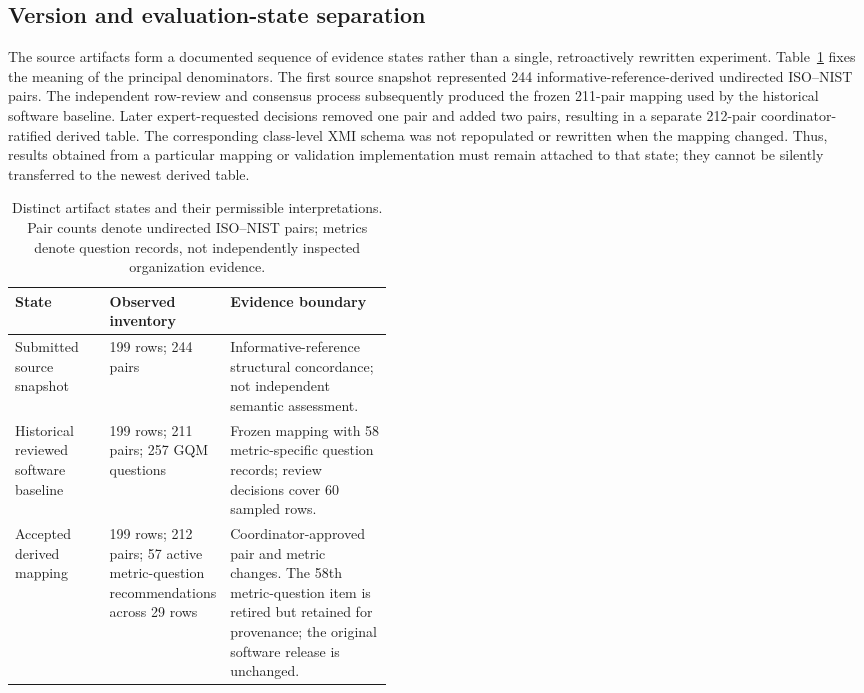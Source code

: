 \documentclass[12pt,a4paper]{article}
\begin{document}
\subsection{Version and evaluation-state separation}
\label{sec:version-states}
The source artifacts form a documented sequence of evidence states rather than a single, retroactively rewritten experiment. Table~\ref{tab:version-states} fixes the meaning of the principal denominators. The first source snapshot represented 244 informative-reference-derived undirected ISO--NIST pairs. The independent row-review and consensus process subsequently produced the frozen 211-pair mapping used by the historical software baseline. Later expert-requested decisions removed one pair and added two pairs, resulting in a separate 212-pair coordinator-ratified derived table. The corresponding class-level XMI schema was not repopulated or rewritten when the mapping changed. Thus, results obtained from a particular mapping or validation implementation must remain attached to that state; they cannot be silently transferred to the newest derived table.

\begin{table}[tbp]\centering\small
\caption{Distinct artifact states and their permissible interpretations. Pair counts denote undirected ISO--NIST pairs; metrics denote question records, not independently inspected organization evidence.}\label{tab:version-states}
\begin{tabularx}{\linewidth}{@{}p{0.25\linewidth}p{0.19\linewidth}X@{}}\toprule
\textbf{State} & \textbf{Observed inventory} & \textbf{Evidence boundary}\\\midrule
Submitted source snapshot & 199 rows; 244 pairs & Informative-reference structural concordance; not independent semantic assessment.\\
Historical reviewed software baseline & 199 rows; 211 pairs; 257 GQM questions & Frozen mapping with 58 metric-specific question records; review decisions cover 60 sampled rows.\\
Accepted derived mapping & 199 rows; 212 pairs; 57 active metric-question recommendations across 29 rows & Coordinator-approved pair and metric changes. The 58th metric-question item is retired but retained for provenance; the original software release is unchanged.\\\bottomrule
\end{tabularx}
\end{table}
\end{document}
